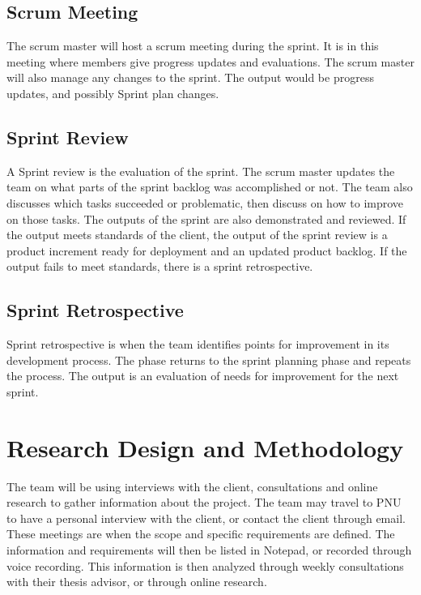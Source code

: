 \subsection{Scrum Meeting}
The scrum master will host a scrum meeting during the sprint. It is in this meeting where members give progress updates and evaluations. The scrum master will also manage any changes to the sprint. The output would be progress updates, and possibly Sprint plan changes.

\subsection{Sprint Review}
A Sprint review is the evaluation of the sprint. The scrum master updates the team on what parts of the sprint backlog was accomplished or not. The team also discusses which tasks succeeded or problematic, then discuss on how to improve on those tasks. The outputs of the sprint are also demonstrated and reviewed. If the output meets standards of the client, the output of the sprint review is a product increment ready for deployment and an updated product backlog. If the output fails to meet standards, there is a sprint retrospective.

\subsection{Sprint Retrospective}
Sprint retrospective is when the team identifies points for improvement in its development process. The phase returns to the sprint planning phase and repeats the process. The output is an evaluation of needs for improvement for the next sprint.

\section{Research Design and Methodology}
The team will be using interviews with the client, consultations and online research to gather information about the project. The team may travel to PNU to have a personal interview with the client, or contact the client through email. These meetings are when the scope and specific requirements are defined. The information and requirements will then be listed in Notepad, or recorded through voice recording. This information is then analyzed through weekly consultations with their thesis advisor, or through online research.

